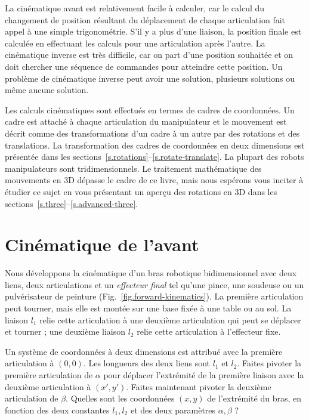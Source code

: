 La cinématique avant est relativement facile à calculer, car le calcul du changement de position résultant du déplacement de chaque articulation fait appel à une simple trigonométrie. S'il y a plus d'une liaison, la position finale est calculée en effectuant les calculs pour une articulation après l'autre. La cinématique inverse est très difficile, car on part d'une position souhaitée et on doit chercher une séquence de commandes pour atteindre cette position. Un problème de cinématique inverse peut avoir une solution, plusieurs solutions ou même aucune solution.

Les calculs cinématiques sont effectués en termes de cadres de coordonnées. Un cadre est attaché à chaque articulation du manipulateur et le mouvement est décrit comme des transformations d'un cadre à un autre par des rotations et des translations. La transformation des cadres de coordonnées en deux dimensions est présentée dans les sections~\ref{s.rotations}--\ref{s.rotate-translate}. La plupart des robots manipulateurs sont tridimensionnels. Le traitement mathématique des mouvements en 3D dépasse le cadre de ce livre, mais nous espérons vous inciter à étudier ce sujet en vous présentant un aperçu des rotations en 3D dans les sections~\ref{s.three}--\ref{s.advanced-three}.

\section{Cinématique de l'avant}\label{s.forward-kinematics}

Nous développons la cinématique d'un bras robotique bidimensionnel avec deux liens, deux articulations et un \emph{effecteur final} tel qu'une pince, une soudeuse ou un pulvérisateur de peinture (Fig.~\ref{fig.forward-kinematics}). La première articulation peut tourner, mais elle est montée sur une base fixée à une table ou au sol. La liaison $l_1$ relie cette articulation à une deuxième articulation qui peut se déplacer et tourner ; une deuxième liaison $l_2$ relie cette articulation à l'effecteur fixe.

Un système de coordonnées à deux dimensions est attribué avec la première articulation à $(0,0)$. Les longueurs des deux liens sont $l_1$ et $l_2$. Faites pivoter la première articulation de $\alpha$ pour déplacer l'extrémité de la première liaison avec la deuxième articulation à $(x',y')$. Faites maintenant pivoter la deuxième articulation de $\beta$. Quelles sont les coordonnées $(x,y)$ de l'extrémité du bras, en fonction des deux constantes $l_1,l_2$ et des deux paramètres $\alpha,\beta$ ?

